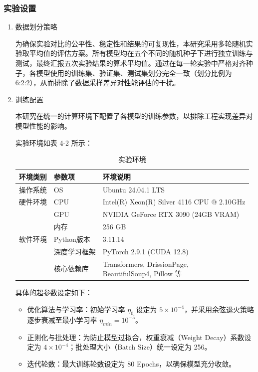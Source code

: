 \subsubsection{实验设置}
\begin{enumerate}[label=(\arabic*)]
  \item 数据划分策略

为确保实验对比的公平性、稳定性和结果的可复现性，本研究采用多轮随机实验取平均值的评估方案。所有模型均在五个不同的随机种子下进行独立训练与测试，最终汇报五次实验结果的算术平均值。通过在每一轮实验中严格对齐种子，各模型使用的训练集、验证集、测试集划分完全一致（划分比例为 6:2:2），从而排除了数据采样差异对性能评估的干扰。

  \item 训练配置

本研究在统一的计算环境下配置了各模型的训练参数，以排除工程实现差异对模型性能的影响。

实验环境如表 4-2 所示：


\begin{table}[H]
\centering
\caption{实验环境}
\label{tab:exp4_2}
\begin{tabular}{@{}p{1.8cm}p{3.1cm}p{6.3cm}@{}}
\toprule
\textbf{环境类别} & \textbf{参数项} & \textbf{环境说明} \\ \midrule
操作系统 & OS & Ubuntu 24.04.1 LTS \\
硬件环境 & CPU & Intel(R) Xeon(R) Silver 4116 CPU @ 2.10GHz \\
 & GPU & NVIDIA GeForce RTX 3090 (24GB VRAM) \\
 & 内存 & 256 GB \\
软件环境 & Python版本 & 3.11.14 \\
 & 深度学习框架 & PyTorch 2.9.1 (CUDA 12.8) \\
 & 核心依赖库 & \makecell[l]{Transformers, DrissionPage,\\ BeautifulSoup4, Pillow 等} \\ \bottomrule
\end{tabular}
\end{table}


具体的超参数设定如下：

\begin{itemize}
  \item 优化算法与学习率：初始学习率 $ \eta_0 $ 设定为 $ 5\times10^{-4} $，并采用余弦退火策略逐步衰减至最小学习率 $ \eta_{min}=10^{-5} $。
  \item 正则化与批处理：为防止模型过拟合，权重衰减（Weight Decay）系数设定为 $ 4\times 10^{-4} $；批处理大小（Batch Size）统一设定为 256。
  \item 迭代轮数：最大训练轮数设定为 80 Epochs，以确保模型充分收敛。
\end{itemize}


\end{enumerate}
